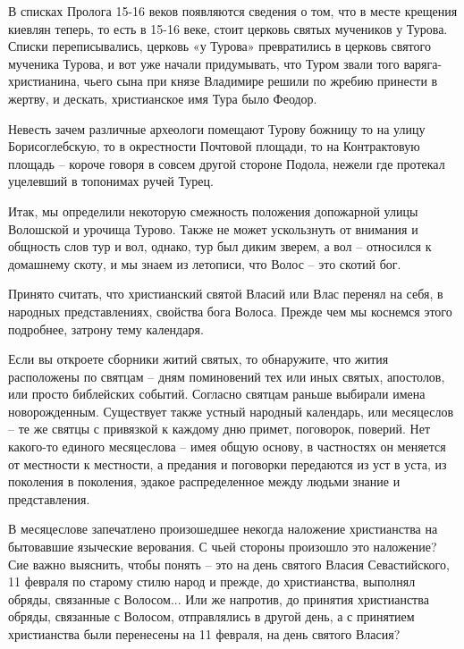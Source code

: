 \documentclass[a5paper,11pt,openany]{article}
\begin{document}
 В списках Пролога 15-16 веков появляются сведения о том, что в месте крещения киевлян теперь, то есть в 15-16 веке, стоит церковь святых мучеников у Турова. Списки переписывались, церковь «у Турова» превратились в церковь святого мученика Турова, и вот уже начали придумывать, что Туром звали того варяга-христианина, чьего сына при князе Владимире решили по жребию принести в жертву, и дескать, христианское имя Тура было Феодор.

   Невесть зачем различные археологи помещают Турову божницу то на улицу Борисоглебскую, то в окрестности Почтовой площади, то на Контрактовую площадь – короче говоря в совсем другой стороне Подола, нежели где протекал уцелевший в топонимах ручей Турец.


   Итак, мы определили некоторую смежность положения допожарной улицы Волошской и урочища Турово. Также не может ускользнуть от внимания и общность слов тур и вол, однако, тур был диким зверем, а вол – относился к домашнему скоту, и мы знаем из летописи, что Волос – это скотий бог.

   Принято считать, что христианский святой Власий или Влас перенял на себя, в народных представлениях, свойства бога Волоса. Прежде чем мы коснемся этого подробнее, затрону тему календаря.

    Если вы откроете сборники житий святых, то обнаружите, что жития расположены по святцам – дням поминовений тех или иных святых, апостолов, или просто библейских событий. Согласно святцам раньше выбирали имена новорожденным. Существует также устный народный календарь, или месяцеслов – те же святцы с привязкой к каждому дню примет, поговорок, поверий. Нет какого-то единого месяцеслова – имея общую основу, в частностях он меняется от местности к местности, а предания и поговорки передаются из уст в уста, из поколения в поколения, эдакое распределенное между людьми знание и представления.

 В месяцеслове запечатлено произошедшее некогда наложение христианства на бытовавшие языческие верования. С чьей стороны произошло это наложение? Сие важно выяснить, чтобы понять – это на день святого Власия Севастийского, 11 февраля по старому стилю народ и прежде, до христианства, выполнял обряды, связанные с Волосом... Или же напротив, до принятия христианства обряды, связанные с Волосом, отправлялись в другой день, а с принятием христианства были перенесены на 11 февраля, на день святого Власия?
\end{document}
